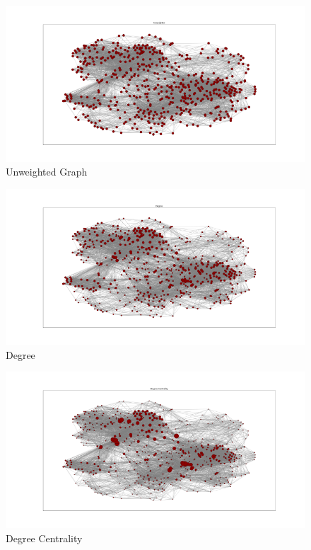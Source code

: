 \documentclass[conference]{IEEEtran}
\begin{document}
\begin{figure}[htb!]
    \centering
    \includegraphics[width=1\linewidth]{images/unweighted.png}
    \caption{Unweighted Graph}
    \label{fig:enter-label}
\end{figure}

\begin{figure}[htb!]
    \centering
    \includegraphics[width=1\linewidth]{images/degree.png}
    \caption{Degree}
    \label{fig:enter-label}
\end{figure}

\begin{figure}[htb!]
    \centering
    \includegraphics[width=1\linewidth]{images/degree_centrality.png}
    \caption{Degree Centrality}
    \label{fig:enter-label}
\end{figure}
\end{document}
